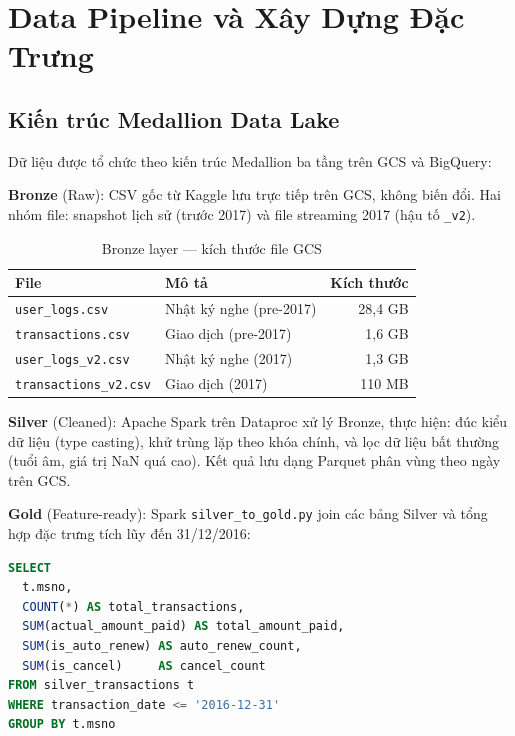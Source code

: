 \documentclass[conference]{IEEEtran}
\begin{document}
\section{Data Pipeline và Xây Dựng Đặc Trưng}
\label{sec:data}

\subsection{Kiến trúc Medallion Data Lake}

Dữ liệu được tổ chức theo kiến trúc Medallion ba tầng trên GCS và BigQuery:

\textbf{Bronze} (Raw): CSV gốc từ Kaggle lưu trực tiếp trên GCS, không biến
đổi. Hai nhóm file: snapshot lịch sử (trước 2017) và file streaming 2017
(hậu tố \texttt{\_v2}).

\begin{table}[htbp]
\caption{Bronze layer — kích thước file GCS}
\label{tab:bronze}
\centering
\begin{tabular}{llr}
\toprule
\textbf{File} & \textbf{Mô tả} & \textbf{Kích thước} \\
\midrule
\texttt{user\_logs.csv}      & Nhật ký nghe (pre-2017) & 28,4 GB \\
\texttt{transactions.csv}    & Giao dịch (pre-2017)    & 1,6 GB  \\
\texttt{user\_logs\_v2.csv}  & Nhật ký nghe (2017)     & 1,3 GB  \\
\texttt{transactions\_v2.csv}& Giao dịch (2017)        & 110 MB  \\
\bottomrule
\end{tabular}
\end{table}

\textbf{Silver} (Cleaned): Apache Spark trên Dataproc xử lý Bronze, thực hiện:
đúc kiểu dữ liệu (type casting), khử trùng lặp theo khóa chính, và lọc dữ
liệu bất thường (tuổi âm, giá trị NaN quá cao). Kết quả lưu dạng Parquet
phân vùng theo ngày trên GCS.

\textbf{Gold} (Feature-ready): Spark \texttt{silver\_to\_gold.py} join các
bảng Silver và tổng hợp đặc trưng tích lũy đến 31/12/2016:

\begin{lstlisting}[language=SQL, caption={Ví dụ aggregation SQL trong Spark}]
SELECT
  t.msno,
  COUNT(*) AS total_transactions,
  SUM(actual_amount_paid) AS total_amount_paid,
  SUM(is_auto_renew) AS auto_renew_count,
  SUM(is_cancel)     AS cancel_count
FROM silver_transactions t
WHERE transaction_date <= '2016-12-31'
GROUP BY t.msno
\end{lstlisting}
\end{document}

